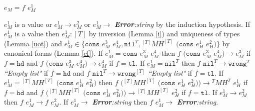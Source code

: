 \begin{case}
$e_{M}=f$ $e_{M}^{1}$

$e_{M}^{1}$ is a value or $e_{M}^{1}\rightarrow e_{M}^{2}$ or $e_{M}^{1}\rightarrow$ \emph{\textbf{Error}:\;string} by the induction hypothesis.  If $e_{M}^{1}$ is a value then $e_{M}^{1}:[T]$ by inversion (Lemma \ref{i}) and uniqueness of types (Lemma \ref{uot}) and $e_{M}^{1}\in\lbrace\mathtt{cons}$ $e_{M}^{3}$ $e_{M}^{4},\mathtt{nil}^{T},{^{[T]}M}H^{[T]}$ $(\mathtt{cons}$ $e_{H}^{1}$ $e_{H}^{2})\rbrace$ by canonical forms (Lemma \ref{cf}).  If $e_{M}^{1}=\mathtt{cons}$ $e_{M}^{3}$ $e_{M}^{4}$ then $f$ $(\mathtt{cons}$ $e_{M}^{3}$ $e_{M}^{4})\rightarrow e_{M}^{3}$ if $f=\mathtt{hd}$ and $f$ $(\mathtt{cons}$ $e_{M}^{3}$ $e_{M}^{4})\rightarrow e_{M}^{4}$ if $f=\mathtt{tl}$.  If $e_{M}^{1}=\mathtt{nil}^{T}$ then $f$ $\mathtt{nil}^{T}\rightarrow\mathtt{wrong}^{T}$ \emph{``Empty list"} if $f=\mathtt{hd}$ and $f$ $\mathtt{nil}^{T}\rightarrow\mathtt{wrong}^{[T]}$ \emph{``Empty list"} if $f=\mathtt{tl}$.  If $e_{M}^{1}={^{[T]}M}H^{[T]}$ $(\mathtt{cons}$ $e_{H}^{1}$ $e_{H}^{2})$ then $f$ $({^{[T]}M}H^{[T]}$ $(\mathtt{cons}$ $e_{H}^{1}$ $e_{H}^{2}))\rightarrow{^{T}M}H^{T}$ $e_{H}^{1}$ if $f=\mathtt{hd}$ and $f$ $({^{[T]}M}H^{[T]}$ $(\mathtt{cons}$ $e_{H}^{1}$ $e_{H}^{2}))\rightarrow{^{[T]}M}H^{[T]}$ $e_{H}^{2}$ if $f=\mathtt{tl}$.  If $e_{M}^{1}\rightarrow e_{M}^{2}$ then $f$ $e_{M}^{1}\rightarrow f$ $e_{M}^{2}$.  If $e_{M}^{1}\rightarrow$ \emph{\textbf{Error}:\;string} then $f$ $e_{M}^{1}\rightarrow$ \emph{\textbf{Error}:\;string}.
\end{case}